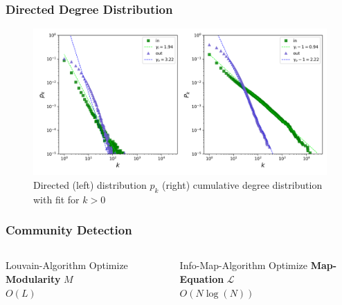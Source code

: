 \documentclass[fleqn]{beamer}
\begin{document}
    \begin{frame}
        \frametitle{Directed Degree Distribution}
    \begin{figure}[htpb]
        \centering
        \includegraphics[width=1\textwidth]{./pics/dist_d.png}
        \caption{Directed (left) distribution $p_k$ (right) cumulative
        degree distribution with fit for $k > 0$}
    \end{figure}
    \end{frame}

    \begin{frame}
        \frametitle{Community Detection}
        \begin{columns}[T]
        \begin{block}{\centering Louvain-Algorithm}
            \centering
            Optimize \textbf{Modularity} $M$\\
            $O(L)$
        \end{block}
        \begin{block}{\centering Info-Map-Algorithm}
            \centering
            Optimize \textbf{Map-Equation} $\mathcal{L}$\\
            $O(N\log(N))$
        \end{block}
        \end{columns}
        \vspace{1cm}
    \end{frame}
\end{document}
